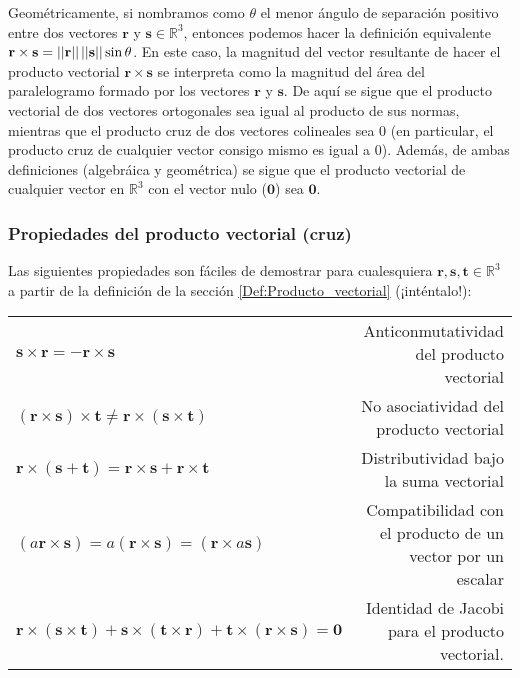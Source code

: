\documentclass[12pt,dvipsnames]{article}
\begin{document}
Geométricamente, si nombramos como $\theta$ el menor ángulo de separación positivo entre dos vectores $\mathbf{r}$ y $\mathbf{s}\in\mathbb{R}^3$, entonces podemos hacer la definición equivalente $\mathbf{r}\times\mathbf{s}=||\mathbf{r}|| \hspace{0.5mm}  ||\mathbf{s}||\sin\theta$. En este caso, la magnitud del vector resultante de hacer el producto vectorial $\mathbf{r}\times\mathbf{s}$ se interpreta como la magnitud del área del paralelogramo formado por los vectores $\mathbf{r}$ y $\mathbf{s}$. De aquí se sigue que el producto vectorial de dos vectores ortogonales sea igual al producto de sus normas, mientras que el producto cruz de dos vectores colineales sea $0$ (en particular, el producto cruz de cualquier vector consigo mismo es igual a $0$). Además, de ambas definiciones (algebráica y geométrica) se sigue que el producto vectorial de cualquier vector en $\mathbb{R}^3$ con el vector nulo ($\mathbf{0}$) sea $\mathbf{0}$.

\subsubsection{Propiedades del producto vectorial (cruz)} \label{Prop:Producto_vectorial}

Las siguientes propiedades son fáciles de demostrar para cualesquiera $\mathbf{r},\mathbf{s},\mathbf{t}\in\mathbb{R}^3$ a partir de la definición de la sección \ref{Def:Producto_vectorial} (¡inténtalo!):

\begin{center}
\begin{tabular}{lr}
    $\mathbf{s}\times\mathbf{r} = -\mathbf{r}\times\mathbf{s}$ & Anticonmutatividad del producto vectorial \\
    $(\mathbf{r}\times\mathbf{s})\times\mathbf{t}\neq\mathbf{r}\times(\mathbf{s}\times\mathbf{t})$ & No asociatividad del producto vectorial \\
    $\mathbf{r}\times(\mathbf{s}+\mathbf{t}) = \mathbf{r}\times\mathbf{s}+\mathbf{r}\times\mathbf{t}$ & Distributividad bajo la suma vectorial \\
    $(a\mathbf{r}\times\mathbf{s}) = a(\mathbf{r}\times\mathbf{s})=(\mathbf{r}\times a\mathbf{s})$ & Compatibilidad con el producto de un vector por un escalar\\
    $\mathbf{r}\times(\mathbf{s}\times\mathbf{t})+\mathbf{s}\times(\mathbf{t}\times\mathbf{r})+\mathbf{t}\times(\mathbf{r}\times\mathbf{s}) = \mathbf{0}$ & Identidad de Jacobi para el producto vectorial.
\end{tabular}
\end{center}
\end{document}
